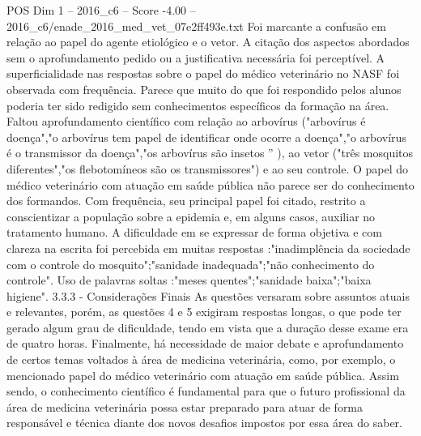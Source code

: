 \begin{textsample}{POS Dim 1 – 2016\_c6 – Score -4.00 – 2016\_c6/enade\_2016\_med\_vet\_07e2ff493e.txt}
Foi marcante a confusão em relação ao papel do agente etiológico e o vetor.
A citação dos aspectos abordados sem o aprofundamento pedido ou a justificativa necessária foi perceptível.
A superficialidade nas respostas sobre o papel do médico veterinário no NASF foi observada com frequência.
Parece que muito do que foi respondido pelos alunos poderia ter sido redigido sem conhecimentos específicos da formação na área.
Faltou aprofundamento científico com relação ao arbovírus ("arbovírus é doença","o arbovírus tem papel de identificar onde ocorre a doença","o arbovírus é o transmissor da doença","os arbovírus são insetos ” ), ao vetor ("três mosquitos diferentes","os flebotomíneos são os transmissores") e ao seu controle.
O papel do médico veterinário com atuação em saúde pública não parece ser do conhecimento dos formandos.
Com frequência, seu principal papel foi citado, restrito a conscientizar a população sobre a epidemia e, em alguns casos, auxiliar no tratamento humano.
A dificuldade em se expressar de forma objetiva e com clareza na escrita foi percebida em muitas respostas :"inadimplência da sociedade com o controle do mosquito";"sanidade inadequada";"não conhecimento do controle".
Uso de palavras soltas :"meses quentes";"sanidade baixa";"baixa higiene". 3.3.3 - Considerações Finais As questões versaram sobre assuntos atuais e relevantes, porém, as questões 4 e 5 exigiram respostas longas, o que pode ter gerado algum grau de dificuldade, tendo em vista que a duração desse exame era de quatro horas.
Finalmente, há necessidade de maior debate e aprofundamento de certos temas voltados à área de medicina veterinária, como, por exemplo, o mencionado papel do médico veterinário com atuação em saúde pública.
Assim sendo, o conhecimento científico é fundamental para que o futuro profissional da área de medicina veterinária possa estar preparado para atuar de forma responsável e técnica diante dos novos desafios impostos por essa área do saber.

\end{textsample}
